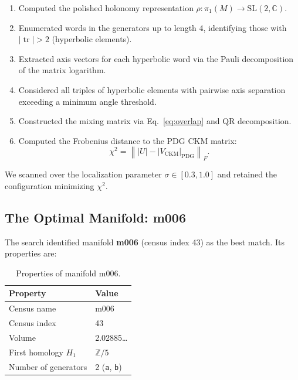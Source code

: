 \documentclass[11pt,a4paper]{article}
\newcommand{\SL}{\mathrm{SL}}
\newcommand{\tr}{\operatorname{tr}}
\newcommand{\CKM}{V_{\mathrm{CKM}}}
\begin{document}
\begin{enumerate}
\item Computed the polished holonomy representation 
$\rho: \pi_1(M) \to \SL(2,\mathbb{C})$.

\item Enumerated words in the generators up to length 4, identifying 
those with $|\tr| > 2$ (hyperbolic elements).

\item Extracted axis vectors for each hyperbolic word via the Pauli 
decomposition of the matrix logarithm.

\item Considered all triples of hyperbolic elements with pairwise 
axis separation exceeding a minimum angle threshold.

\item Constructed the mixing matrix via Eq.~\eqref{eq:overlap} and 
QR decomposition.

\item Computed the Frobenius distance to the PDG CKM matrix:
\begin{equation}
\chi^2 = \left\| |U| - |\CKM|_{\mathrm{PDG}} \right\|_F.
\end{equation}
\end{enumerate}

We scanned over the localization parameter $\sigma \in [0.3, 1.0]$
and retained the configuration minimizing $\chi^2$.

\subsection{The Optimal Manifold: m006}
\label{subsec:m006}

The search identified manifold \textbf{m006} (census index 43) as 
the best match. Its properties are:

\begin{table}[h]
\centering
\begin{tabular}{ll}
\toprule
Property & Value \\
\midrule
Census name & m006 \\
Census index & 43 \\
Volume & 2.02885\ldots \\
First homology $H_1$ & $\mathbb{Z}/5$ \\
Number of generators & 2 (\texttt{a}, \texttt{b}) \\
\bottomrule
\end{tabular}
\caption{Properties of manifold m006.}
\label{tab:m006}
\end{table}
\end{document}
